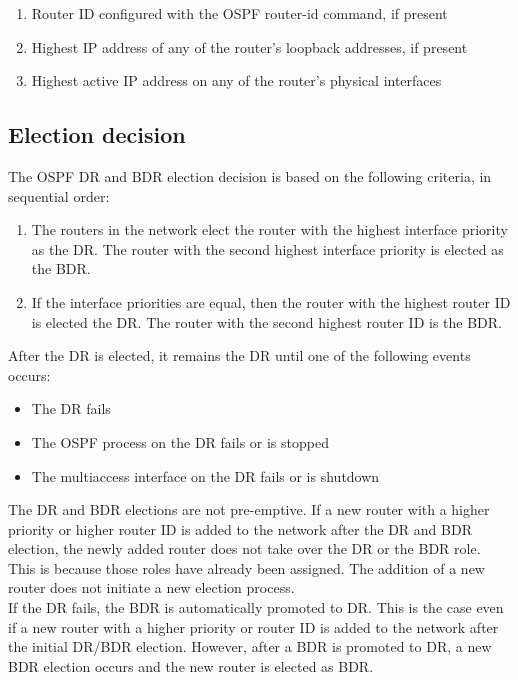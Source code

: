 \begin{enumerate}
\item Router ID configured with the OSPF router-id command, if present 
\item Highest IP address of any of the router’s loopback addresses, if present 
\item Highest active IP address on any of the router’s physical interfaces
\end{enumerate}

\subsection{Election decision}
	
The OSPF DR and BDR election decision is based on the following criteria, in sequential order:

\begin{enumerate}
\item The routers in the network elect the router with the highest interface priority as the DR. The router with the second highest interface priority is elected as the BDR.
\item If the interface priorities are equal, then the router with the highest router ID is elected the DR. The router with the second highest router ID is the BDR.
\end{enumerate}
	
After the DR is elected, it remains the DR until one of the following events occurs:

\begin{itemize}
\item The DR fails
\item The OSPF process on the DR fails or is stopped
\item The multiaccess interface on the DR fails or is shutdown
\end{itemize}
	
The DR and BDR elections are not pre-emptive. If a new router with a higher priority or higher router ID is added to the network after the DR and BDR election, the newly added router does not take over the DR or the BDR role. This is because those roles have already been assigned. The addition of a new router does not initiate a new election process.\\

If the DR fails, the BDR is automatically promoted to DR. This is the case even if a new router with a higher priority or router ID is added to the network after the initial DR/BDR election. However, after a BDR is promoted to DR, a new BDR election occurs and the new router is elected as BDR.

